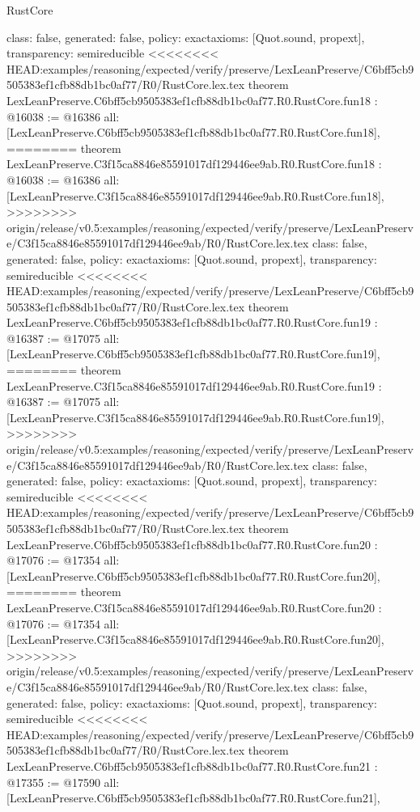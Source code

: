 \begin{lexlean}{RustCore}
\begin{coremodule}
{\begin{coremodule}
{{{{{{{{{{{{{{{{{{{{{  class: false,
  generated: false,
  policy: exact{axioms: [Quot.sound, propext]},
  transparency: semireducible
}
<<<<<<<< HEAD:examples/reasoning/expected/verify/preserve/LexLeanPreserve/C6bff5cb9505383ef1cfb88db1bc0af77/R0/RustCore.lex.tex
theorem LexLeanPreserve.C6bff5cb9505383ef1cfb88db1bc0af77.R0.RustCore.fun18 : @16038 := @16386 {
  all: [LexLeanPreserve.C6bff5cb9505383ef1cfb88db1bc0af77.R0.RustCore.fun18],
========
theorem LexLeanPreserve.C3f15ca8846e85591017df129446ee9ab.R0.RustCore.fun18 : @16038 := @16386 {
  all: [LexLeanPreserve.C3f15ca8846e85591017df129446ee9ab.R0.RustCore.fun18],
>>>>>>>> origin/release/v0.5:examples/reasoning/expected/verify/preserve/LexLeanPreserve/C3f15ca8846e85591017df129446ee9ab/R0/RustCore.lex.tex
  class: false,
  generated: false,
  policy: exact{axioms: [Quot.sound, propext]},
  transparency: semireducible
}
<<<<<<<< HEAD:examples/reasoning/expected/verify/preserve/LexLeanPreserve/C6bff5cb9505383ef1cfb88db1bc0af77/R0/RustCore.lex.tex
theorem LexLeanPreserve.C6bff5cb9505383ef1cfb88db1bc0af77.R0.RustCore.fun19 : @16387 := @17075 {
  all: [LexLeanPreserve.C6bff5cb9505383ef1cfb88db1bc0af77.R0.RustCore.fun19],
========
theorem LexLeanPreserve.C3f15ca8846e85591017df129446ee9ab.R0.RustCore.fun19 : @16387 := @17075 {
  all: [LexLeanPreserve.C3f15ca8846e85591017df129446ee9ab.R0.RustCore.fun19],
>>>>>>>> origin/release/v0.5:examples/reasoning/expected/verify/preserve/LexLeanPreserve/C3f15ca8846e85591017df129446ee9ab/R0/RustCore.lex.tex
  class: false,
  generated: false,
  policy: exact{axioms: [Quot.sound, propext]},
  transparency: semireducible
}
<<<<<<<< HEAD:examples/reasoning/expected/verify/preserve/LexLeanPreserve/C6bff5cb9505383ef1cfb88db1bc0af77/R0/RustCore.lex.tex
theorem LexLeanPreserve.C6bff5cb9505383ef1cfb88db1bc0af77.R0.RustCore.fun20 : @17076 := @17354 {
  all: [LexLeanPreserve.C6bff5cb9505383ef1cfb88db1bc0af77.R0.RustCore.fun20],
========
theorem LexLeanPreserve.C3f15ca8846e85591017df129446ee9ab.R0.RustCore.fun20 : @17076 := @17354 {
  all: [LexLeanPreserve.C3f15ca8846e85591017df129446ee9ab.R0.RustCore.fun20],
>>>>>>>> origin/release/v0.5:examples/reasoning/expected/verify/preserve/LexLeanPreserve/C3f15ca8846e85591017df129446ee9ab/R0/RustCore.lex.tex
  class: false,
  generated: false,
  policy: exact{axioms: [Quot.sound, propext]},
  transparency: semireducible
}
<<<<<<<< HEAD:examples/reasoning/expected/verify/preserve/LexLeanPreserve/C6bff5cb9505383ef1cfb88db1bc0af77/R0/RustCore.lex.tex
theorem LexLeanPreserve.C6bff5cb9505383ef1cfb88db1bc0af77.R0.RustCore.fun21 : @17355 := @17590 {
  all: [LexLeanPreserve.C6bff5cb9505383ef1cfb88db1bc0af77.R0.RustCore.fun21],
}}}}}}}}}}}}}}}}}}}}}}}}
\end{coremodule}}
\end{coremodule}
\end{lexlean}
